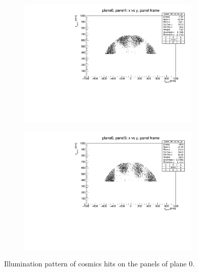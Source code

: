 \begin{figure}[!h]
\begin{subfigure}[b]{0.4\textwidth}
        \includegraphics[width=0.95\textwidth]{figures/pdf/plane0_panel4_x_vs_y_all.pdf}
        \label{fig:panel4plane0}
    \end{subfigure}
    \hfill
    \begin{subfigure}[b]{0.4\textwidth}
        \centering
        \includegraphics[width=0.95\textwidth]{figures/pdf/plane0_panel5_x_vs_y_all.pdf}
        \label{fig:panel5plane0}
    \end{subfigure}
       \caption{Illumination pattern of cosmics hits on the panels of plane 0.}
       \label{fig:plane0}
\end{figure}
